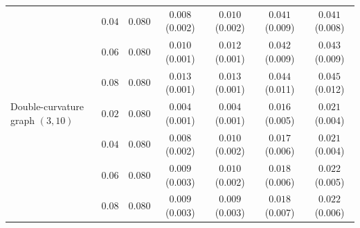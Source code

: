 \begin{tabular}{lcccccc}
 & $0.04$ & $0.080$ & $0.008$ \scriptsize(0.002) & $0.010$ \scriptsize(0.002) & $0.041$ \scriptsize(0.009) & $0.041$ \scriptsize(0.008) \\
 & $0.06$ & $0.080$ & $0.010$ \scriptsize(0.001) & $0.012$ \scriptsize(0.001) & $0.042$ \scriptsize(0.009) & $0.043$ \scriptsize(0.009) \\
 & $0.08$ & $0.080$ & $0.013$ \scriptsize(0.001) & $0.013$ \scriptsize(0.001) & $0.044$ \scriptsize(0.011) & $0.045$ \scriptsize(0.012) \\
\midrule
Double-curvature graph $(3,10)$ & $0.02$ & $0.080$ & $0.004$ \scriptsize(0.001) & $0.004$ \scriptsize(0.001) & $0.016$ \scriptsize(0.005) & $0.021$ \scriptsize(0.004) \\
 & $0.04$ & $0.080$ & $0.008$ \scriptsize(0.002) & $0.010$ \scriptsize(0.002) & $0.017$ \scriptsize(0.006) & $0.021$ \scriptsize(0.004) \\
 & $0.06$ & $0.080$ & $0.009$ \scriptsize(0.003) & $0.010$ \scriptsize(0.002) & $0.018$ \scriptsize(0.006) & $0.022$ \scriptsize(0.005) \\
 & $0.08$ & $0.080$ & $0.009$ \scriptsize(0.003) & $0.009$ \scriptsize(0.003) & $0.018$ \scriptsize(0.007) & $0.022$ \scriptsize(0.006) \\
\bottomrule
\end{tabular}
